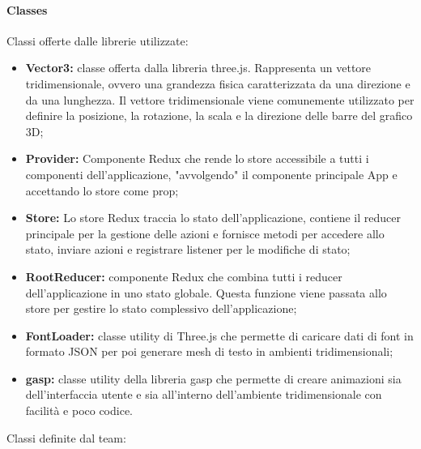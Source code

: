 \paragraph{Classes}
    Classi offerte dalle librerie utilizzate:
    \begin{itemize}
        \item \textbf{Vector3:} classe offerta dalla libreria three.js. Rappresenta un vettore tridimensionale, ovvero
        una grandezza fisica caratterizzata da una direzione e da una lunghezza. Il vettore tridimensionale
        viene comunemente utilizzato per definire la posizione, la rotazione, la scala e la direzione
        delle barre del grafico 3D;
        \item \textbf{Provider:} Componente Redux che rende lo store accessibile a tutti i componenti dell'applicazione, "avvolgendo" il componente principale App e accettando lo store come prop;
        \item \textbf{Store:} Lo store Redux traccia lo stato dell'applicazione, contiene il reducer principale per la gestione delle azioni e fornisce metodi per accedere allo stato,
        inviare azioni e registrare listener per le modifiche di stato;
        \item \textbf{RootReducer:} componente Redux che combina tutti i reducer dell’applicazione in uno stato
        globale. Questa funzione viene passata allo store per gestire lo stato complessivo dell’applicazione;
        \item \textbf{FontLoader:} classe utility di Three.js che permette di caricare dati di font in formato JSON per poi generare mesh di testo in ambienti tridimensionali;
        \item \textbf{gasp:} classe utility della libreria gasp che permette di creare animazioni sia dell'interfaccia utente e sia all'interno dell'ambiente tridimensionale con facilità e poco codice.
    \end{itemize}
    Classi definite dal team:
